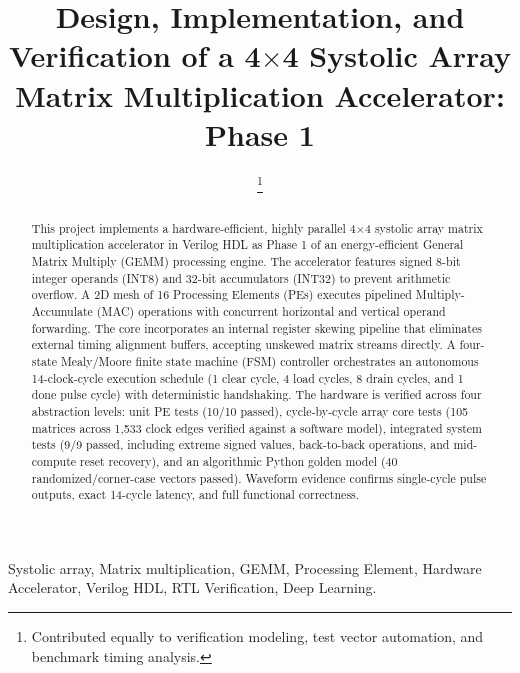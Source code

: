 \documentclass[conference]{IEEEtran}
\begin{document}
\title{Design, Implementation, and Verification of a 4$\times$4 Systolic Array Matrix Multiplication Accelerator: Phase 1}

\author{
\thanks{Contributed equally to verification modeling, test vector automation, and benchmark timing analysis.}
}

\maketitle

\begin{abstract}
This project implements a hardware-efficient, highly parallel 4$\times$4 systolic array matrix multiplication accelerator in Verilog HDL as Phase 1 of an energy-efficient General Matrix Multiply (GEMM) processing engine. The accelerator features signed 8-bit integer operands (INT8) and 32-bit accumulators (INT32) to prevent arithmetic overflow. A 2D mesh of 16 Processing Elements (PEs) executes pipelined Multiply-Accumulate (MAC) operations with concurrent horizontal and vertical operand forwarding. The core incorporates an internal register skewing pipeline that eliminates external timing alignment buffers, accepting unskewed matrix streams directly. A four-state Mealy/Moore finite state machine (FSM) controller orchestrates an autonomous 14-clock-cycle execution schedule (1 clear cycle, 4 load cycles, 8 drain cycles, and 1 done pulse cycle) with deterministic handshaking. The hardware is verified across four abstraction levels: unit PE tests (10/10 passed), cycle-by-cycle array core tests (105 matrices across 1,533 clock edges verified against a software model), integrated system tests (9/9 passed, including extreme signed values, back-to-back operations, and mid-compute reset recovery), and an algorithmic Python golden model (40 randomized/corner-case vectors passed). Waveform evidence confirms single-cycle pulse outputs, exact 14-cycle latency, and full functional correctness.
\end{abstract}

\begin{IEEEkeywords}
Systolic array, Matrix multiplication, GEMM, Processing Element, Hardware Accelerator, Verilog HDL, RTL Verification, Deep Learning.
\end{IEEEkeywords}
\end{document}
